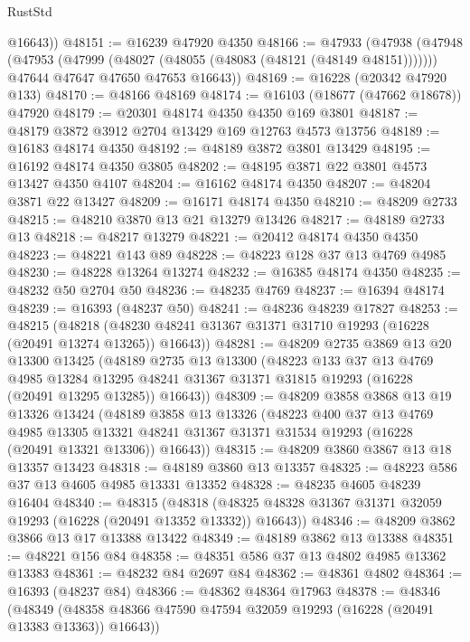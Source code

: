 \begin{lexlean}{RustStd}
\begin{coremodule}
        @16643))
@48151 := @16239 @47920 @4350
@48166 := @47933
    (@47938
      (@47948
        (@47953 (@47999 (@48027 (@48055 (@48083 (@48121 (@48149 @48151)))))))
        @47644
        @47647
        @47650
        @47653
        @16643))
@48169 := @16228 (@20342 @47920 @133)
@48170 := @48166 @48169
@48174 := @16103 (@18677 (@47662 @18678)) @47920
@48179 := @20301 @48174 @4350 @4350 @169 @3801
@48187 := @48179 @3872 @3912 @2704 @13429 @169 @12763 @4573 @13756
@48189 := @16183 @48174 @4350
@48192 := @48189 @3872 @3801 @13429
@48195 := @16192 @48174 @4350 @3805
@48202 := @48195 @3871 @22 @3801 @4573 @13427 @4350 @4107
@48204 := @16162 @48174 @4350
@48207 := @48204 @3871 @22 @13427
@48209 := @16171 @48174 @4350
@48210 := @48209 @2733
@48215 := @48210 @3870 @13 @21 @13279 @13426
@48217 := @48189 @2733 @13
@48218 := @48217 @13279
@48221 := @20412 @48174 @4350 @4350
@48223 := @48221 @143 @89
@48228 := @48223 @128 @37 @13 @4769 @4985
@48230 := @48228 @13264 @13274
@48232 := @16385 @48174 @4350
@48235 := @48232 @50 @2704 @50
@48236 := @48235 @4769
@48237 := @16394 @48174
@48239 := @16393 (@48237 @50)
@48241 := @48236 @48239 @17827
@48253 := @48215
    (@48218 (@48230 @48241 @31367 @31371 @31710 @19293 (@16228 (@20491 @13274 @13265)) @16643))
@48281 := @48209
    @2735
    @3869
    @13
    @20
    @13300
    @13425
    (@48189
      @2735
      @13
      @13300
      (@48223
        @133
        @37
        @13
        @4769
        @4985
        @13284
        @13295
        @48241
        @31367
        @31371
        @31815
        @19293
        (@16228 (@20491 @13295 @13285))
        @16643))
@48309 := @48209
    @3858
    @3868
    @13
    @19
    @13326
    @13424
    (@48189
      @3858
      @13
      @13326
      (@48223
        @400
        @37
        @13
        @4769
        @4985
        @13305
        @13321
        @48241
        @31367
        @31371
        @31534
        @19293
        (@16228 (@20491 @13321 @13306))
        @16643))
@48315 := @48209 @3860 @3867 @13 @18 @13357 @13423
@48318 := @48189 @3860 @13 @13357
@48325 := @48223 @586 @37 @13 @4605 @4985 @13331 @13352
@48328 := @48235 @4605 @48239 @16404
@48340 := @48315
    (@48318 (@48325 @48328 @31367 @31371 @32059 @19293 (@16228 (@20491 @13352 @13332)) @16643))
@48346 := @48209 @3862 @3866 @13 @17 @13388 @13422
@48349 := @48189 @3862 @13 @13388
@48351 := @48221 @156 @84
@48358 := @48351 @586 @37 @13 @4802 @4985 @13362 @13383
@48361 := @48232 @84 @2697 @84
@48362 := @48361 @4802
@48364 := @16393 (@48237 @84)
@48366 := @48362 @48364 @17963
@48378 := @48346
    (@48349 (@48358 @48366 @47590 @47594 @32059 @19293 (@16228 (@20491 @13383 @13363)) @16643))

\end{coremodule}
\end{lexlean}
